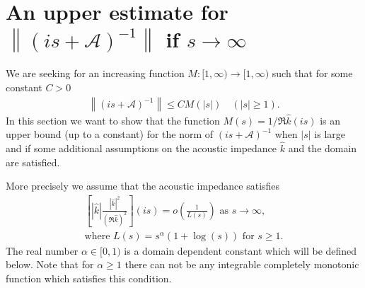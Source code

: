 \documentclass{amsart}
\newcommand{\abs}[1]{\left|#1\right|}
\newcommand{\norm}[1]{\left\| #1 \right\|}
\newcommand{\A}{\mathcal{A}}
\newcommand{\khat}{\hat{k}}
\begin{document}
\section{An upper estimate for $\norm{(is+\A)^{-1}}$ if $s\rightarrow\infty$}\label{sec: upper resolvent estimate}
We are seeking for an increasing function $M:[1,\infty)\rightarrow[1,\infty)$ such that for some constant $C>0$
\begin{align*}
 \norm{(is+\A)^{-1}} \leq C M(\abs{s}) \quad (\abs{s}\geq 1).
\end{align*}
In this section we want to show that the function $M(s) = 1/\Re \khat(is)$ is an upper bound (up to a constant) for the norm of $(is+\A)^ {-1}$ when $\abs{s}$ is large and if some additional assumptions on the acoustic impedance $\khat$ and the domain are satisfied.

More precisely we assume that the acoustic impedance satisfies
\begin{align}\label{eq: additional assumptions}
 \left[\abs{\khat}\frac{\abs{\khat}^2}{(\Re\khat)^2}\right](is) = o\left(\frac{1}{L(s)}\right) \text{ as } s\rightarrow\infty, \\ \nonumber
 \text{where } L(s) = s^{\alpha}(1+\log(s)) \text{ for } s \geq 1 .
\end{align}
The real number $\alpha\in[0,1)$ is a domain dependent constant which will be defined below. Note that for $\alpha\geq1$ there can not be any integrable completely monotonic function which satisfies this condition. 
\end{document}
